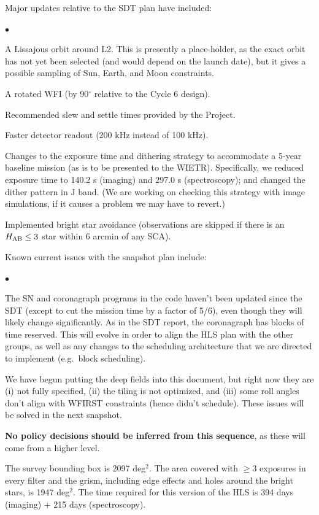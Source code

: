 Major updates relative to the SDT plan have included:
\begin{list}{$\bullet$}{}
\item A Lissajous orbit around L2. This is presently a place-holder, as the exact orbit has not yet been selected (and would depend on the launch date), but it gives a possible sampling of Sun, Earth, and Moon constraints.
\item A rotated WFI (by 90$^\circ$ relative to the Cycle 6 design).
\item Recommended slew and settle times provided by the Project.
\item Faster detector readout (200 kHz instead of 100 kHz).
\item Changes to the exposure time and dithering strategy to accommodate a 5-year baseline mission (as is to be presented to the WIETR). Specifically, we reduced exposure time to 140.2 s (imaging) and 297.0 s (spectroscopy); and changed the dither pattern in J band. (We are working on checking this strategy with image simulations, if it causes a problem we may have to revert.)
\item Implemented bright star avoidance (observations are skipped if there is an $H_{\rm AB}\le 3$ star within 6 arcmin of any SCA).
\end{list}
Known current issues with the snapshot plan include:
\begin{list}{$\bullet$}{}
\item
The SN and coronagraph programs in the code haven't been updated since the SDT (except to cut the mission time by a factor of 5/6), even though they will likely change significantly. As in the SDT report, the coronagraph has blocks of time reserved. This will evolve in order to align the HLS plan with the other groups, as well as any changes to the scheduling architecture that we are directed to implement (e.g.\ block scheduling).
\item
We have begun putting the deep fields into this document, but right now they are (i) not fully specified, (ii) the tiling is not optimized, and (iii) some roll angles don't align with WFIRST constraints (hence didn't schedule). These issues will be solved in the next snapshot.
\end{list}
{\bfseries No policy decisions should be inferred from this sequence}, as these will come from a higher level.

The survey bounding box is 2097 deg$^2$. The area covered with $\ge 3$ exposures in every filter and the grism, including edge effects and holes around the bright stars, is 1947 deg$^2$. The time required for this version of the HLS is 394 days (imaging) + 215 days (spectroscopy).

